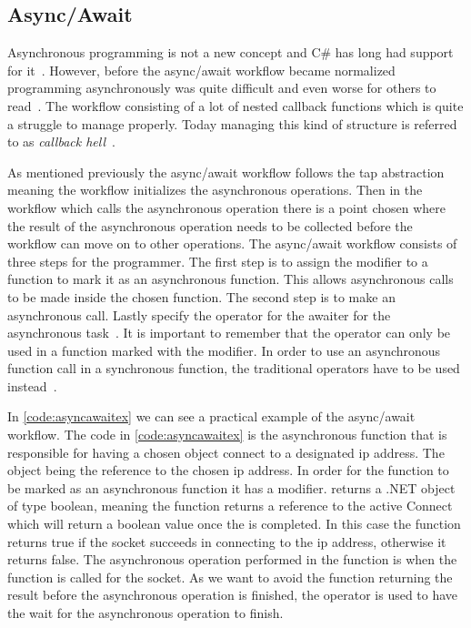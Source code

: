 \subsection{Async/Await}
Asynchronous programming is not a new concept and C\# has long had support for it~\cite{WEB:asyncNelsen}. However, before the async/await workflow became normalized programming asynchronously was quite difficult and even worse for others to read~\cite{DOC:TaskAsyncProgModel}. The workflow consisting of a lot of nested callback functions which is quite a struggle to manage properly. Today managing this kind of structure is referred to as \emph{callback hell}~\cites[p.~1-2]{PAPER:Callbackhell}[p~.2]{PAPER:PaxosCleipnir}.

As mentioned previously the async/await workflow follows the \ac{tap} abstraction~\cite{DOC:TaskAsyncProgModel} meaning the workflow initializes the asynchronous operations. Then in the workflow which calls the asynchronous operation there is a point chosen where the result of the asynchronous operation needs to be collected before the workflow can move on to other operations. The async/await workflow consists of three steps for the programmer. The first step is to assign the  modifier to a function to mark it as an asynchronous function. This allows asynchronous calls to be made inside the chosen function. The second step is to make an asynchronous call. Lastly specify the  operator for the awaiter for the asynchronous task~\cite{WEB:AsyncAwaitTut, DOC:AsyncAwait, VIDEO:AsyncConBack}.
It is important to remember that the  operator can only be used in a function marked with the  modifier. In order to use an asynchronous function call in a synchronous function, the traditional operators have to be used instead~\cite{DOC:AsyncAwait, DOC:TaskAsyncProgModel}.

In \autoref{code:asyncawaitex} we can see a practical example of the async/await workflow.
The code in \autoref{code:asyncawaitex} is the asynchronous function that is responsible for having a chosen  object connect to a designated \ac{ip} address. The  object being the reference to the chosen \ac{ip} address. In order for the  function to be marked as an asynchronous function it has a  modifier.  returns a .NET  object of type boolean, meaning the function returns a reference to the active Connect  which will return a boolean value once the  is completed. In this case the  function returns true if the socket succeeds in connecting to the \ac{ip} address, otherwise it returns false. The asynchronous operation performed in the  function is when the  function is called for the socket. As we want to avoid the function returning the result before the asynchronous operation is finished, the  operator is used to have the  wait for the asynchronous operation to finish.
\fi

